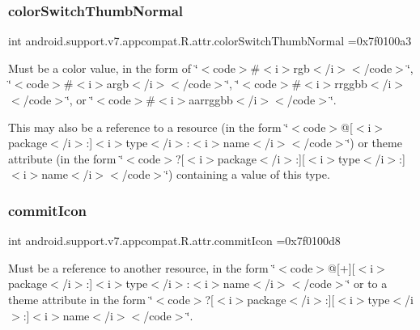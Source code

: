 \subsubsection{\texorpdfstring{color\+Switch\+Thumb\+Normal}{colorSwitchThumbNormal}}
{\footnotesize\ttfamily int android.\+support.\+v7.\+appcompat.\+R.\+attr.\+color\+Switch\+Thumb\+Normal =0x7f0100a3\hspace{0.3cm}{\ttfamily [static]}}

Must be a color value, in the form of \char`\"{}$<$code$>$\#$<$i$>$rgb$<$/i$>$$<$/code$>$\char`\"{}, \char`\"{}$<$code$>$\#$<$i$>$argb$<$/i$>$$<$/code$>$\char`\"{}, \char`\"{}$<$code$>$\#$<$i$>$rrggbb$<$/i$>$$<$/code$>$\char`\"{}, or \char`\"{}$<$code$>$\#$<$i$>$aarrggbb$<$/i$>$$<$/code$>$\char`\"{}. 

This may also be a reference to a resource (in the form \char`\"{}$<$code$>$@\mbox{[}$<$i$>$package$<$/i$>$\+:\mbox{]}$<$i$>$type$<$/i$>$\+:$<$i$>$name$<$/i$>$$<$/code$>$\char`\"{}) or theme attribute (in the form \char`\"{}$<$code$>$?\mbox{[}$<$i$>$package$<$/i$>$\+:\mbox{]}\mbox{[}$<$i$>$type$<$/i$>$\+:\mbox{]}$<$i$>$name$<$/i$>$$<$/code$>$\char`\"{}) containing a value of this type. \mbox{\label{classandroid_1_1support_1_1v7_1_1appcompat_1_1R_1_1attr_ad9135efd389d1f3758191b4d2f193530}} 
\subsubsection{\texorpdfstring{commit\+Icon}{commitIcon}}
{\footnotesize\ttfamily int android.\+support.\+v7.\+appcompat.\+R.\+attr.\+commit\+Icon =0x7f0100d8\hspace{0.3cm}{\ttfamily [static]}}

Must be a reference to another resource, in the form \char`\"{}$<$code$>$@\mbox{[}+\mbox{]}\mbox{[}$<$i$>$package$<$/i$>$\+:\mbox{]}$<$i$>$type$<$/i$>$\+:$<$i$>$name$<$/i$>$$<$/code$>$\char`\"{} or to a theme attribute in the form \char`\"{}$<$code$>$?\mbox{[}$<$i$>$package$<$/i$>$\+:\mbox{]}\mbox{[}$<$i$>$type$<$/i$>$\+:\mbox{]}$<$i$>$name$<$/i$>$$<$/code$>$\char`\"{}. \mbox{\label{classandroid_1_1support_1_1v7_1_1appcompat_1_1R_1_1attr_a0de2c511147e44102ccb77312c667d73}} 
